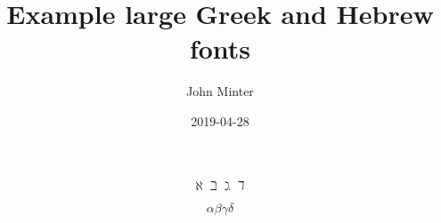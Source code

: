 \documentclass{article}
\title{Example large Greek and Hebrew fonts}
\author{John Minter}
\date{2019-04-28}
\begin{document}
\[ \aleph \beth \gimel \daleth \]

\[ \alpha \beta \gamma \delta \]
\end{document}
